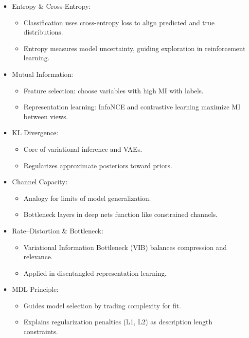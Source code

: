 \documentclass[
  letterpaper,
  DIV=11,
  numbers=noendperiod]{scrreprt}
\providecommand{\tightlist}{%
  \setlength{\itemsep}{0pt}\setlength{\parskip}{0pt}}
\begin{document}
\begin{itemize}
\item
  Entropy \& Cross-Entropy:

  \begin{itemize}
  \tightlist
  \item
    Classification uses cross-entropy loss to align predicted and true
    distributions.
  \item
    Entropy measures model uncertainty, guiding exploration in
    reinforcement learning.
  \end{itemize}
\item
  Mutual Information:

  \begin{itemize}
  \tightlist
  \item
    Feature selection: choose variables with high MI with labels.
  \item
    Representation learning: InfoNCE and contrastive learning maximize
    MI between views.
  \end{itemize}
\item
  KL Divergence:

  \begin{itemize}
  \tightlist
  \item
    Core of variational inference and VAEs.
  \item
    Regularizes approximate posteriors toward priors.
  \end{itemize}
\item
  Channel Capacity:

  \begin{itemize}
  \tightlist
  \item
    Analogy for limits of model generalization.
  \item
    Bottleneck layers in deep nets function like constrained channels.
  \end{itemize}
\item
  Rate--Distortion \& Bottleneck:

  \begin{itemize}
  \tightlist
  \item
    Variational Information Bottleneck (VIB) balances compression and
    relevance.
  \item
    Applied in disentangled representation learning.
  \end{itemize}
\item
  MDL Principle:

  \begin{itemize}
  \tightlist
  \item
    Guides model selection by trading complexity for fit.
  \item
    Explains regularization penalties (L1, L2) as description length
    constraints.
  \end{itemize}
\end{itemize}
\end{document}
